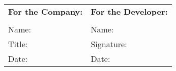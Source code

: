 \documentclass[12pt]{ctexart}
\begin{document}
\vspace{1cm}

\begin{tabular}{p{8cm}p{8cm}}
\textbf{For the Company:} & \textbf{For the Developer:} \\
\underline{\hspace{8cm}} & \underline{\hspace{8cm}} \\
Name: \underline{\hspace{6cm}} & Name: \underline{\hspace{6cm}} \\
Title: \underline{\hspace{6cm}} & Signature: \underline{\hspace{6cm}} \\
Date: \underline{\hspace{6cm}} & Date: \underline{\hspace{6cm}} \\
\end{tabular}
\end{document}
